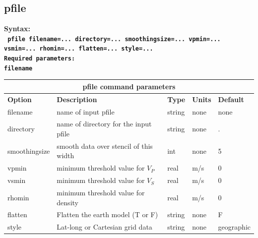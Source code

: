 \documentclass[11pt]{report}
\begin{document}
\subsection{pfile}
\label{keyword:pfile}
\begin{flushleft}\bf
Syntax:\\
\tt
pfile filename=... directory=... smoothingsize=... vpmin=... vsmin=... rhomin=... flatten=... style=... \\
\bf Required parameters:\\
\tt filename
\end{flushleft}
%
\begin{center}
\begin{tabular}{|l|p{8cm}|l|l||l|} \hline
\multicolumn{5}{|c|}{\bf pfile command parameters}\\ \hline
{\bf Option} & {\bf Description}                        & {\bf Type} & {\bf Units} & {\bf Default} \\ \hline 
\hline
filename      & name of input pfile                     & string  & none & none \\ \hline
directory     & name of directory for the input pfile   & string  & none & . \\ \hline
smoothingsize & smooth data over stencil of this width  & int     & none & 5 \\ \hline
vpmin         & minimum threshold value for $V_P$       & real   & m/s  & 0  \\ \hline
vsmin         & minimum threshold value for $V_S$       & real   & m/s  & 0  \\ \hline
rhomin        & minimum threshold value for density     & real   & m/s  & 0  \\ \hline
flatten       & Flatten the earth model (T or F)        & string  & none & F  \\ \hline
style         & Lat-long or Cartesian grid data         & string  & none & geographic \\ \hline
\end{tabular}
\end{center}

\end{document}
